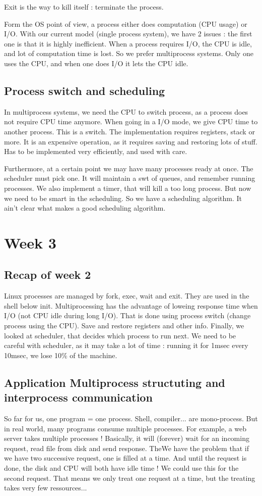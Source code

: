\documentclass[12pt,a4paper]{article}
\begin{document}
Exit is the way to kill itself : terminate the process.

Form the OS point of view, a process either does computation (CPU usage) or I/O. With our current model (single process system), we have 2 issues : the first one is that it is highly inefficient. When a process requires I/O, the CPU is idle, and lot of computation time is lost. So we prefer multiprocess systems. Only one uses the CPU, and when one does I/O it lets the CPU idle.

\subsection{Process switch and scheduling}
In multiprocess systems, we need the CPU to switch process, as a process does not require CPU time anymore. When going in a I/O mode, we give CPU time to another process. This is a switch. The implementation requires registers, stack or more. It is an expensive operation, as it requires saving and restoring lots of stuff. Has to be implemented very efficiently, and used with care. 

Furthermore, at a certain point we may have many processes ready at once. The scheduler must pick one. It will maintain a swt of queues, and remember running processes. We also implement a timer, that will kill a too long process. But now we need to be smart in the scheduling. So we have a scheduling algorithm. It ain't clear what makes a good scheduling algorithm.

\section{Week 3}
\subsection{Recap of week 2}
Linux processes are managed by fork, exec, wait and exit. They are used in the shell below init. Multiprocessing has the advantage of loweing response time when I/O (not CPU idle during long I/O). That is done using process switch (change process using the CPU). Save and restore registers and other info. Finally, we looked at scheduler, that decides which process to run next. We need to be careful with scheduler, as it may take a lot of time : running it for 1msec every 10msec, we lose 10\% of the machine.

\subsection{Application Multiprocess structuting and interprocess communication}
So far for us, one program  = one process. Shell, compiler... are mono-process. But in real world, many programs consume multiple processes. For example, a web server takes multiple processes ! Basically, it will (forever) wait for an incoming request, read file from disk and send response. TheWe have the problem that if we have two successive request, one is filled at a time. And until the request is done, the disk and CPU will both have idle time ! We could use this for the second request. That means we only treat one request at a time, but the treating takes very few ressources...
\end{document}
